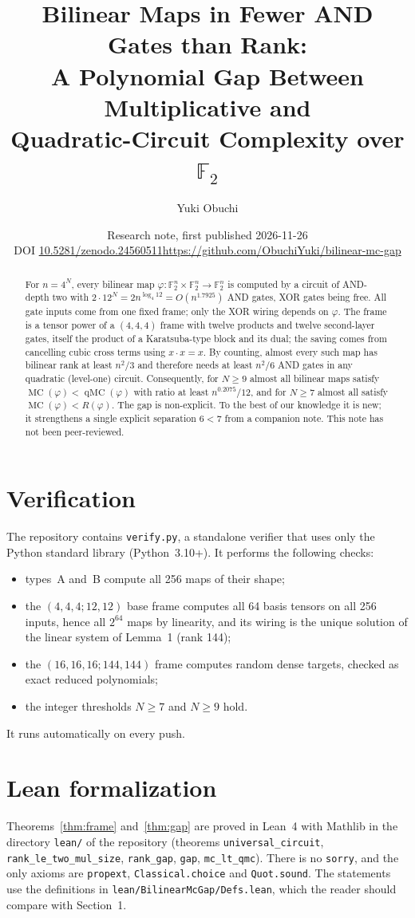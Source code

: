 \documentclass[11pt,a4paper]{article}
\title{Bilinear Maps in Fewer AND Gates than Rank:\\ A Polynomial Gap Between Multiplicative and\\ Quadratic-Circuit Complexity over $\mathbb F_2$}
\author{Yuki Obuchi}
\date{Research note, first published 2026-11-26\\ \small DOI \href{https://doi.org/10.5281/zenodo.24560511}{10.5281/zenodo.24560511}\quad \url{https://github.com/ObuchiYuki/bilinear-mc-gap}}
\DeclareMathOperator{\MC}{MC}
\DeclareMathOperator{\qMC}{qMC}
\theoremstyle{remark}
\newcommand{\F}{\mathbb F_2}
\begin{document}
\maketitle
\begin{abstract}
For $n=4^N$, every bilinear map $\varphi:\F^n\times\F^n\to\F^n$ is computed by a circuit of AND-depth two with $2\cdot 12^N=2n^{\log_4 12}=O(n^{1.7925})$ AND gates, XOR gates being free. All gate inputs come from one fixed frame; only the XOR wiring depends on $\varphi$. The frame is a tensor power of a $(4,4,4)$ frame with twelve products and twelve second-layer gates, itself the product of a Karatsuba-type block and its dual; the saving comes from cancelling cubic cross terms using $x\cdot x=x$. By counting, almost every such map has bilinear rank at least $n^2/3$ and therefore needs at least $n^2/6$ AND gates in any quadratic (level-one) circuit. Consequently, for $N\ge 9$ almost all bilinear maps satisfy $\MC(\varphi)<\qMC(\varphi)$ with ratio at least $n^{0.2075}/12$, and for $N\ge 7$ almost all satisfy $\MC(\varphi)<R(\varphi)$. The gap is non-explicit. To the best of our knowledge it is new; it strengthens a single explicit separation $6<7$ from a companion note. This note has not been peer-reviewed.
\end{abstract}



\section*{Verification}
The repository contains \texttt{verify.py}, a standalone verifier that uses only the Python standard library (Python~3.10+). It performs the following checks:
\begin{itemize}
\item types~A and~B compute all 256 maps of their shape;
\item the $(4,4,4;12,12)$ base frame computes all 64 basis tensors on all 256 inputs, hence all $2^{64}$ maps by linearity, and its wiring is the unique solution of the linear system of Lemma~1 (rank 144);
\item the $(16,16,16;144,144)$ frame computes random dense targets, checked as exact reduced polynomials;
\item the integer thresholds $N\ge7$ and $N\ge9$ hold.
\end{itemize}
It runs automatically on every push.

\section*{Lean formalization}
Theorems~\ref{thm:frame} and~\ref{thm:gap} are proved in Lean~4 with Mathlib in the directory \texttt{lean/} of the repository (theorems \texttt{universal\_circuit}, \texttt{rank\_le\_two\_mul\_size}, \texttt{rank\_gap}, \texttt{gap}, \texttt{mc\_lt\_qmc}). There is no \texttt{sorry}, and the only axioms are \texttt{propext}, \texttt{Classical.choice} and \texttt{Quot.sound}. The statements use the definitions in \texttt{lean/BilinearMcGap/Defs.lean}, which the reader should compare with Section~1.
\end{document}
